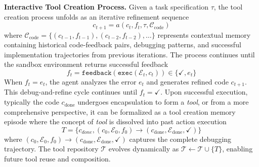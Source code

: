\documentclass{article} %
\begin{document}
\textbf{Interactive Tool Creation Process.} Given a task specification $\tau$, the tool creation process unfolds as an iterative refinement sequence
\begin{equation}
c_{t+1} = a(c_t, f_t, \tau, \mathcal{C}_{\text{code}})
\end{equation}
where $\mathcal{C}_{\text{code}} = \{(c_{t-1}, f_{t-1}), (c_{t-2}, f_{t-2}), \ldots\}$ represents contextual memory containing historical code-feedback pairs, debugging patterns, and successful implementation trajectories from previous iterations. The process continues until the sandbox environment returns successful feedback
\begin{equation}
f_t = \texttt{feedback}(\texttt{exec}(\mathcal{E}_t, c_t)) \in \{\checkmark, e_t\}
\end{equation}
When $f_t = e_t$, the agent analyzes the error $e_t$ and generates refined code $c_{t+1}$. This debug-and-refine cycle continues until $f_t = \checkmark$. Upon successful execution, typically the code $c_\text{done}$ undergoes encapsulation to form a \textit{tool}, or from a more comprehensive perspective, it can be formalized as a tool creation memory episode where the concept of \textit{tool} is dissolved into past action execution
\begin{equation}
\label{eq3}
    T = \{ c_{done}, (c_{0}, \mathcal{E}_0, f_0) \rightarrow (c_\text{done}, \mathcal{E}_\text{done}, \checkmark) \}
\end{equation}
where $(c_{0}, \mathcal{E}_0, f_0) \rightarrow (c_\text{done}, \mathcal{E}_\text{done}, \checkmark)$ captures the complete debugging trajectory. The tool repository $\mathcal{T}$ evolves dynamically as $ \mathcal{T} \leftarrow \mathcal{T} \cup \{T\}$, enabling future tool reuse and composition.
\end{document}
